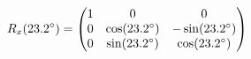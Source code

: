 \documentclass[preview]{standalone}
\begin{document}
\begin{align*}
\special{dvisvgm:raw <g id='unique000'>}R_x(23.2^\circ) = \begin{pmatrix} 1 & 0 & 0 \\ 0 & \cos(23.2^\circ) & -\sin(23.2^\circ) \\ 0 & \sin(23.2^\circ) & \cos(23.2^\circ) \end{pmatrix}\special{dvisvgm:raw </g>}
\end{align*}
\end{document}
